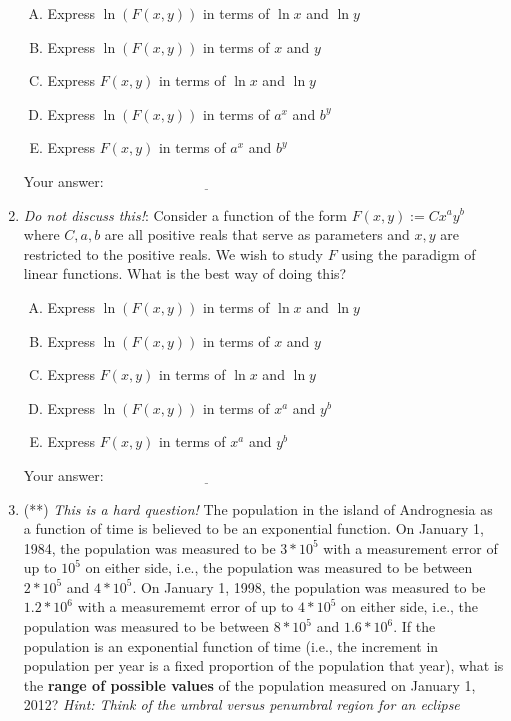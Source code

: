 \documentclass[10pt]{amsart}
\begin{document}
\begin{enumerate}
  \begin{enumerate}[(A)]
  \item Express $\ln(F(x,y))$ in terms of $\ln x$ and $\ln y$
  \item Express $\ln(F(x,y))$ in terms of $x$ and $y$
  \item Express $F(x,y)$ in terms of $\ln x$ and $\ln y$
  \item Express $\ln(F(x,y))$ in terms of $a^x$ and $b^y$
  \item Express $F(x,y)$ in terms of $a^x$ and $b^y$
  \end{enumerate}

  \vspace{0.1in}
  Your answer: $\underline{\qquad\qquad\qquad\qquad\qquad\qquad\qquad}$
  \vspace{0.6in}

\item {\em Do not discuss this!}: Consider a function of the form
  $F(x,y) := Cx^ay^b$ where $C,a,b$ are all positive reals that serve
  as parameters and $x,y$ are restricted to the positive reals. We
  wish to study $F$ using the paradigm of linear functions. What is
  the best way of doing this?

  \begin{enumerate}[(A)]
  \item Express $\ln(F(x,y))$ in terms of $\ln x$ and $\ln y$
  \item Express $\ln(F(x,y))$ in terms of $x$ and $y$
  \item Express $F(x,y)$ in terms of $\ln x$ and $\ln y$
  \item Express $\ln(F(x,y))$ in terms of $x^a$ and $y^b$
  \item Express $F(x,y)$ in terms of $x^a$ and $y^b$
  \end{enumerate}

  \vspace{0.1in}
  Your answer: $\underline{\qquad\qquad\qquad\qquad\qquad\qquad\qquad}$
  \vspace{0.6in}

\item (**) {\em This is a hard question!} The population in the island
  of Andrognesia as a function of time is believed to be an
  exponential function. On January 1, 1984, the population was
  measured to be $3 * 10^5$ with a measurement error of up to $10^5$
  on either side, i.e., the population was measured to be between $2*
  10^5$ and $4 * 10^5$. On January 1, 1998, the population was
  measured to be $1.2 * 10^6$ with a measurememt error of up to $4 *
  10^5$ on either side, i.e., the population was measured to be
  between $8 * 10^5$ and $1.6 * 10^6$. If the population is an
  exponential function of time (i.e., the increment in population per
  year is a fixed proportion of the population that year), what is the
  {\bf range of possible values} of the population measured on January
  1, 2012? {\em Hint: Think of the umbral versus penumbral region for
    an eclipse}


\end{enumerate}
\end{document}
